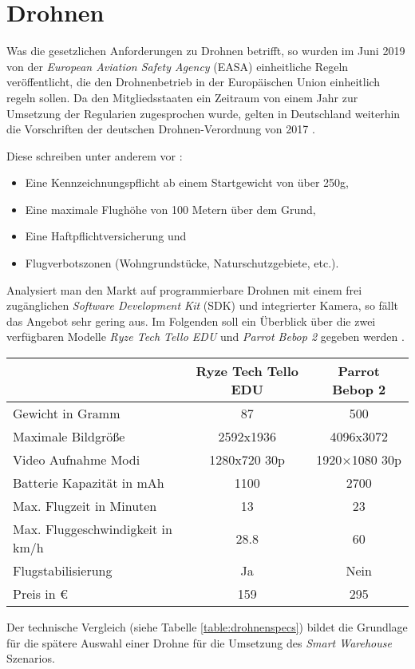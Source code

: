 \section{Drohnen} \label{drohnen}

Was die gesetzlichen Anforderungen zu Drohnen betrifft, so wurden im Juni 2019 von der \textit{European Aviation Safety Agency} (EASA) einheitliche Regeln veröffentlicht, die den Drohnenbetrieb in der Europäischen Union einheitlich regeln sollen. Da den Mitgliedsstaaten ein Zeitraum von einem Jahr zur Umsetzung der Regularien zugesprochen wurde, gelten in Deutschland weiterhin die Vorschriften der deutschen Drohnen-Verordnung von 2017 \cite{EASA.2019}.

Diese schreiben unter anderem vor \cite{Drohnen.de.2020}:
\begin{itemize}
	\item Eine Kennzeichnungspflicht ab einem Startgewicht von über 250g,
	\item Eine maximale Flughöhe von 100 Metern über dem Grund,
	\item Eine Haftpflichtversicherung und
	\item Flugverbotszonen (Wohngrundstücke, Naturschutzgebiete, etc.).
\end{itemize}

Analysiert man den Markt auf programmierbare Drohnen mit einem frei zugänglichen \textit{Software Development Kit} (SDK) und integrierter Kamera, so fällt das Angebot sehr gering aus. Im Folgenden soll ein Überblick über die zwei verfügbaren Modelle \textit{Ryze Tech Tello EDU} und \textit{Parrot Bebop 2} gegeben werden \cite{RyzeRobotics.2020, Parrot.20200520}.

\begin{center}
	\begin{tabular}[H]{l|c|c}
		& Ryze Tech Tello EDU & Parrot Bebop 2\\
		\hline
		Gewicht in Gramm & 87 & 500 \\
		Maximale Bildgröße & 2592x1936 & 4096x3072 \\
		Video Aufnahme Modi & 1280x720 30p & 1920×1080 30p \\
		Batterie Kapazität in mAh & 1100 & 2700 \\
		Max. Flugzeit in Minuten & 13 & 23 \\
		Max. Fluggeschwindigkeit in km/h & 28.8 & 60 \\
		Flugstabilisierung & Ja & Nein \\
		Preis in € & 159 & 295
	\end{tabular}
	\label{table:drohnenspecs}
\end{center}

Der technische Vergleich (siehe Tabelle \ref{table:drohnenspecs}) bildet die Grundlage für die spätere Auswahl einer Drohne für die Umsetzung des \textit{Smart Warehouse} Szenarios.